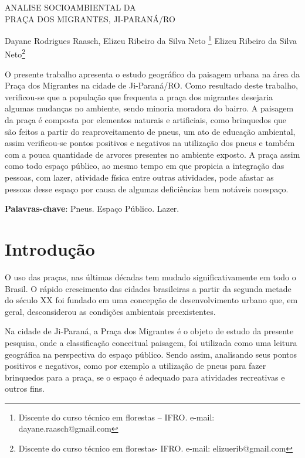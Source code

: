\documentclass[article,12pt,onesidea,4paper,english,brazil]{abntex2}
\begin{document}
	
	
	\frenchspacing 
	
	\begin{center}
		\LARGE ANALISE SOCIOAMBIENTAL DA\\PRAÇA DOS MIGRANTES, JI-PARANÁ/RO
		
		\normalsize
	Dayane Rodrigues Raasch, Elizeu Ribeiro da Silva Neto \footnote{Discente do curso técnico em florestas – IFRO. e-mail: dayane.raasch@gmail.com} 
	Elizeu Ribeiro da Silva Neto\footnote{Discente do curso técnico em florestas- IFRO. e-mail: elizuerib@gmail.com} 
	
	\end{center}
	
	\begin{resumoumacoluna}
		O presente trabalho apresenta o estudo geográfico da paisagem urbana na área da Praça dos Migrantes na cidade de Ji-Paraná/RO. Como resultado deste trabalho, verificou-se que a população que frequenta a praça dos migrantes desejaria algumas mudanças no ambiente, sendo minoria moradora do bairro. A paisagem da praça é composta por elementos naturais e artificiais, como brinquedos que são feitos a partir do reaproveitamento de pneus, um ato de educação ambiental, assim verificou-se pontos positivos e negativos na utilização dos pneus e também com a pouca quantidade de arvores presentes no ambiente exposto. A praça assim como todo espaço público, ao mesmo tempo em que propicia a integração das pessoas, com lazer, atividade física entre outras atividades, pode afastar as pessoas desse espaço por causa de algumas deficiências bem notáveis noespaço.
	
		
		\vspace{\onelineskip}
		
		\noindent
		\textbf{Palavras-chave}: Pneus. Espaço Público. Lazer.
	\end{resumoumacoluna}
	
	\section*{Introdução}
	
	O uso das praças, nas últimas décadas tem mudado significativamente em todo o Brasil. O rápido crescimento das cidades brasileiras a partir da segunda metade do século XX foi fundado em uma concepção de desenvolvimento urbano que, em geral, desconsiderou as condições ambientais preexistentes.
	
	Na cidade de Ji-Paraná, a Praça dos Migrantes é o objeto de estudo da presente pesquisa, onde a classificação conceitual paisagem, foi utilizada como uma leitura geográfica na perspectiva do espaço público. Sendo assim, analisando seus pontos positivos e negativos, como por exemplo a utilização de pneus para fazer brinquedos para a praça, se o espaço é adequado para atividades recreativas e outros fins.
	
\end{document}

